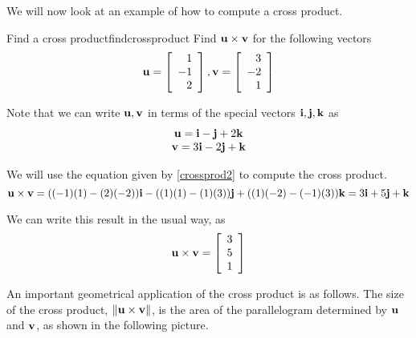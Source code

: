 We will now look at an example of how to compute a cross product.

\begin{example}{Find a cross product}{findcrossproduct}
Find ${\bf u} \times {\bf v}$ for the following vectors
\begin{equation*}
{\bf u}
=
\left[
\begin{array}{r}
1 \\
-1 \\
2
\end{array}
\right],
{\bf v}
=
\left[
\begin{array}{r}
3 \\
-2 \\
1
\end{array}
\right]
\end{equation*}
\end{example}

\begin{solution}
Note that we can write ${\bf u}, {\bf v}$ in terms of the special vectors ${\bf i},
{\bf j}, {\bf k}$ as 
\begin{equation*}
\begin{array}{c}
{\bf u}
=
{\bf i}-{\bf j}+2{\bf k} \\
{\bf v}
=
 3{\bf i}-2{\bf j}+{\bf k}
\end{array}
\end{equation*}

We will use the equation given by \ref{crossprod2} to compute the cross product. 
\begin{equation*}
{\bf u} \times {\bf v}
=((-1)(1)-(2)(-2)) {\bf i}- ((1)(1)-(1)(3)) {\bf j}+((1)(-2)-(-1)(3)) {\bf k}=3{\bf i}+5{\bf j}+{\bf k}
\end{equation*}

We can write this result in the usual way, as
\begin{equation*}
{\bf u} \times {\bf v}
=
\left[
\begin{array}{r}
3 \\
5 \\
1
\end{array}
\right]
\end{equation*}

\end{solution}

An important geometrical application of the cross product is as follows. The size of the cross product, $\| {\bf u}\times {\bf v}\| $, is the area of the
parallelogram determined by ${\bf u}$ and ${\bf v}$, as shown in the following picture. 

